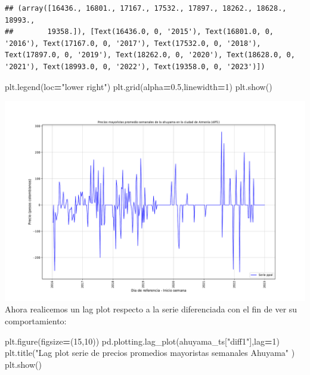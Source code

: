 \documentclass[
]{book}
\newenvironment{Shaded}{\begin{snugshade}}{\end{snugshade}}
\newcommand{\DecValTok}[1]{\textcolor[rgb]{0.00,0.00,0.81}{#1}}
\newcommand{\FloatTok}[1]{\textcolor[rgb]{0.00,0.00,0.81}{#1}}
\newcommand{\NormalTok}[1]{#1}
\newcommand{\OperatorTok}[1]{\textcolor[rgb]{0.81,0.36,0.00}{\textbf{#1}}}
\newcommand{\StringTok}[1]{\textcolor[rgb]{0.31,0.60,0.02}{#1}}
\begin{document}
\begin{verbatim}
## (array([16436., 16801., 17167., 17532., 17897., 18262., 18628., 18993.,
##        19358.]), [Text(16436.0, 0, '2015'), Text(16801.0, 0, '2016'), Text(17167.0, 0, '2017'), Text(17532.0, 0, '2018'), Text(17897.0, 0, '2019'), Text(18262.0, 0, '2020'), Text(18628.0, 0, '2021'), Text(18993.0, 0, '2022'), Text(19358.0, 0, '2023')])
\end{verbatim}

\begin{Shaded}
\begin{Highlighting}[]
\NormalTok{plt.legend(loc}\OperatorTok{=}\StringTok{"lower right"}\NormalTok{)}
\NormalTok{plt.grid(alpha}\OperatorTok{=}\FloatTok{0.5}\NormalTok{,linewidth}\OperatorTok{=}\DecValTok{1}\NormalTok{)}
\NormalTok{plt.show()}
\end{Highlighting}
\end{Shaded}

\includegraphics{bookdown-demo_files/figure-latex/unnamed-chunk-50-9.pdf}
Ahora realicemos un lag plot respecto a la serie diferenciada con el fin de ver su comportamiento:

\begin{Shaded}
\begin{Highlighting}[]

\NormalTok{plt.figure(figsize}\OperatorTok{=}\NormalTok{(}\DecValTok{15}\NormalTok{,}\DecValTok{10}\NormalTok{))}
\NormalTok{pd.plotting.lag\_plot(ahuyama\_ts[}\StringTok{"diff1"}\NormalTok{],lag}\OperatorTok{=}\DecValTok{1}\NormalTok{)}
\NormalTok{plt.title(}\StringTok{"Lag plot serie de precios promedios mayoristas semanales Ahuyama"}\NormalTok{ )}
\NormalTok{plt.show()}
\end{Highlighting}
\end{Shaded}
\end{document}
